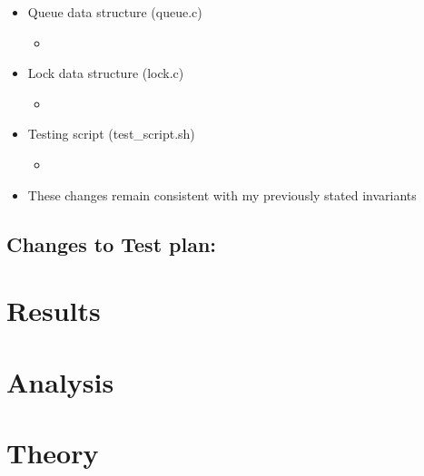 \documentclass[]{article}
\begin{document}
\begin{itemize}
\begin{itemize}
	\end{itemize}
	\item Queue data structure (queue.c)
	\begin{itemize}
		\item 
	\end{itemize}
	\item Lock data structure (lock.c)
	\begin{itemize}
		\item 
	\end{itemize}
	\item Testing script (test\_script.sh)
	\begin{itemize}
		\item
	\end{itemize}
	\item These changes remain consistent with my previously stated invariants
\end{itemize}

\subsection{Changes to Test plan:}

\section{Results}

\section{Analysis}

\section{Theory}
	
\end{document}
